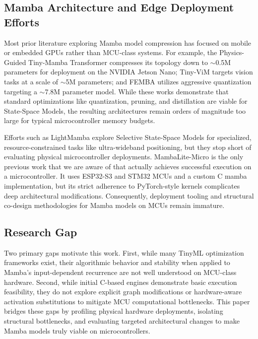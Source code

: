 \subsection{Mamba Architecture and Edge Deployment Efforts}

Most prior literature exploring Mamba model compression has focused on mobile or embedded GPUs rather than MCU-class systems. For example, the Physics-Guided Tiny-Mamba Transformer \cite{liPhysicsGuidedTinyMambaTransformer2026} compresses its topology down to $\sim$0.5M parameters for deployment on the NVIDIA Jetson Nano; Tiny-ViM \cite{maTinyViMFrequencyDecoupling2025} targets vision tasks at a scale of $\sim$5M parameters; and FEMBA \cite{tegonFEMBAEdgePhysiologicallyAware2026a} utilizes aggressive quantization targeting a $\sim$7.8M parameter model. While these works demonstrate that standard optimizations like quantization, pruning, and distillation are viable for State-Space Models, the resulting architectures remain orders of magnitude too large for typical microcontroller memory budgets.

Efforts such as LightMamba \cite{wangLightMambaResourceEfficientDeepLearning2026} explore Selective State-Space Models for specialized, resource-constrained tasks like ultra-wideband positioning, but they stop short of evaluating physical microcontroller deployments. MambaLite-Micro \cite{xuMambaLiteMicroMemoryOptimizedMamba2025} is the only previous work that we are aware of that actually achieves successful execution on a microcontroller. It uses ESP32-S3 and STM32 MCUs and a custom C mamba implementation, but its strict adherence to PyTorch-style kernels complicates deep architectural modifications. Consequently, deployment tooling and structural co-design methodologies for Mamba models on MCUs remain immature.

\subsection{Research Gap}

Two primary gaps motivate this work. First, while many TinyML optimization frameworks exist, their algorithmic behavior and stability when applied to Mamba's input-dependent recurrence are not well understood on MCU-class hardware. Second, while initial C-based engines demonstrate basic execution feasibility, they do not explore explicit graph modifications or hardware-aware activation substitutions to mitigate MCU computational bottlenecks. This paper bridges these gaps by profiling physical hardware deployments, isolating structural bottlenecks, and evaluating targeted architectural changes to make Mamba models truly viable on microcontrollers.
